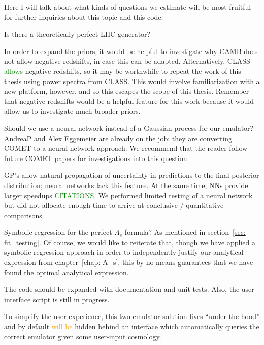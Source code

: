 Here I will talk about what kinds of questions we estimate will be most 
fruitful for further inquiries about this topic and this code.


Is there a theoretically perfect LHC generator?


In order to expand the priors, it would be helpful to investigate why CAMB 
does not allow negative redshifts, in case this can be adapted. 
Alternatively, 
CLASS \textcolor{green}{allows} negative redshifts, so it may be worthwhile 
to 
repeat the work of this thesis using power spectra from CLASS. This would 
involve familiarization with a new platform, however, and so this escapes the 
scope of this thesis. Remember that negative redshifts would be a helpful 
feature for this work because it would allow us to investigate much broader 
priors.


Should we use a neural network instead of a Gaussian process for our emulator? 
AndreaP and Alex Eggemeier are already on the job: they are converting COMET 
to a neural network approach. We recommend that the reader follow future COMET 
papers for investigations into this question.

GP's allow natural propagation of
uncertainty in predictions to the final posterior distribution; neural
networks lack this feature. At the same time, NNs provide larger speedups 
\textcolor{green}{CITATIONS}. We performed limited testing of a neural network
but did not allocate enough time to arrive at conclusive / quantitative
comparisons.

Symbolic regression for the perfect $A_s$ formula?
As mentioned in section~\ref{sec: fit_testing}.
Of course, we would 
like to reiterate that, though we have applied a symbolic regression approach 
in order to independently justify our analytical expression from
chapter~\ref{chap: A_s}, this by no means guarantees that we have found the 
optimal analytical expression.


The code should be expanded with documentation and unit tests. Also, the
user interface script is still in progress.

To simplify the user experience, this two-emulator solution lives ``under the
hood'' and by default \textcolor{orange}{will be} hidden behind an interface
which automatically queries the correct emulator given some user-input
cosmology.

